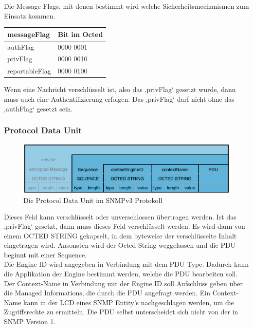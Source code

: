 \documentclass[11pt,a4paper]{article}
\begin{document}
\emptyline
Die Message Flags, mit denen bestimmt wird welche Sicherheitsmechanismen zum Einsatz kommen.
\begin{tabular}{| l | l |}
	\hline
	\rowcolor{lgray}
	messageFlag			&			Bit im Octed\\
	\hline
	authFlag					&			0000 0001\\
	\hline
	privFlag					&			0000 0010\\
	\hline
	reportableFlag			&			0000 0100\\
	\hline
\end{tabular}
\emptyline
Wenn eine Nachricht verschlüsselt ist, also das ‚privFlag‘ gesetzt wurde, dann muss auch eine Authentifizierung erfolgen. Das ‚privFlag‘ darf nicht ohne das ‚authFlag‘ gesetzt sein.

\subsubsection{Protocol Data Unit}
\begin{figure}[h]
	\centering
	\includegraphics[scale=.8]{Bilder/SNMPv3-PDU.png}
	\caption{Die Protocol Data Unit im SNMPv3 Protokoll}
\end{figure}
Dieses Feld kann verschlüsselt oder unverschlossen übertragen werden. Ist das ‚privFlag‘ gesetzt, dann muss dieses Feld verschlüsselt werden. Es wird dann von einem OCTED STRING gekapselt, in dem byteweise der verschlüsselte Inhalt eingetragen wird.
Ansonsten wird der Octed String weggelassen und die PDU beginnt mit einer Sequence.\\
Die Engine ID wird angegeben in Verbindung mit dem PDU Type. Dadurch kann die Applikation der Engine bestimmt werden, welche die PDU bearbeiten soll.\\
Der Context-Name in Verbindung mit der Engine ID soll Aufschluss geben über die Managed Informations, die durch die PDU angefragt werden. Ein Context-Name kann in der LCD eines SNMP Entity’s nachgeschlagen werden, um die Zugriffsrechte zu ermitteln.
Die PDU selbst unterscheidet sich nicht von der in SNMP Version 1.\\

\end{document}
